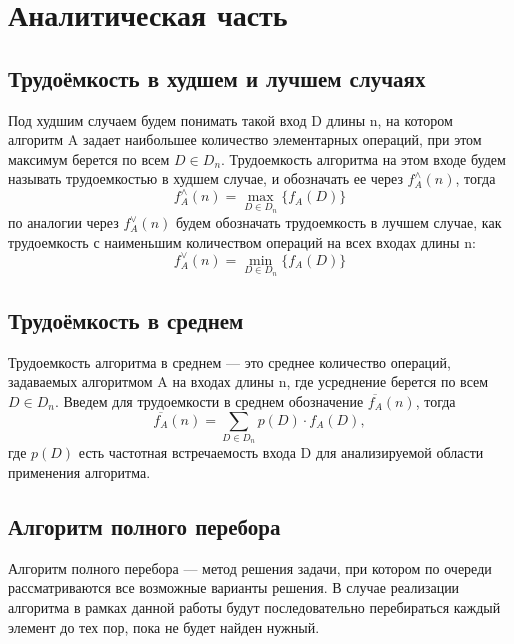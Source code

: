 \chapter{Аналитическая часть}

\section{Трудоёмкость в худшем и лучшем случаях}
Под худшим случаем будем понимать такой вход D длины n, на котором алгоритм A задает наибольшее количество элементарных операций, при этом максимум берется по всем $D \in D_{n}$. Трудоемкость алгоритма на этом входе будем называть трудоемкостью в худшем случае, и обозначать ее через ${f^\wedge_{A}}(n)$, тогда
\begin{equation}
	\label{for:formula1}
	{f^\wedge_{A}}(n) = \max_{D \in D_{n}}\{f_{A}(D)\}
\end{equation}
по аналогии через ${f^\vee_{A}}(n)$ будем обозначать трудоемкость в лучшем случае, как 
трудоемкость с наименьшим количеством операций на всех входах длины n:
\begin{equation}
	\label{for:formula2}
	{f^\vee_{A}}(n) = \min_{D \in D_{n}}\{f_{A}(D)\}
\end{equation}
\section{Трудоёмкость в среднем}

Трудоемкость алгоритма в среднем --- это среднее количество операций, задаваемых алгоритмом A на входах длины n, где усреднение берется по всем $D \in D_{n}$.
Введем для трудоемкости в среднем обозначение $\overline{f_{A}}(n)$, тогда
\begin{equation}
	\label{for:formula3}
	\overline{f_{A}}(n) = \sum_{D \in D_{n}} p(D) \cdot f_{A}(D),
\end{equation}
где $p(D)$ есть частотная встречаемость входа D для анализируемой области применения алгоритма. 

\section{Алгоритм полного перебора}
Алгоритм полного перебора --- метод решения задачи, при котором по очереди рассматриваются все возможные варианты решения. 
В случае реализации алгоритма в рамках данной работы будут последовательно перебираться каждый элемент до тех пор, пока не будет найден нужный.